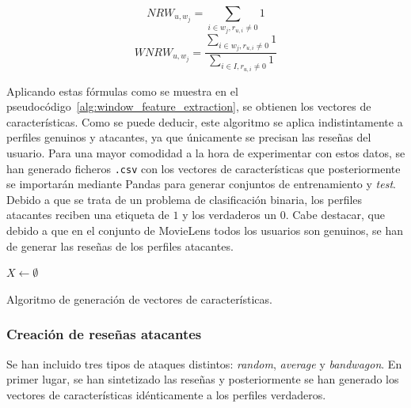 \begin{equation}\label{eqn:NRW} NRW_{u, w_j} = \sum_{i\in w_j, r_{u,i} \ne 0}^{} 1 \end{equation}
\begin{equation}\label{eqn:WNRW} WNRW_{u, w_j} = \frac{\sum_{i\in w_j, r_{u,i} \ne 0}^{} 1}{\sum_{i\in I, r_{u,i} \ne 0}^{} 1} \end{equation}

Aplicando estas fórmulas como se muestra en el pseudocódigo~\ref{alg:window_feature_extraction}, se obtienen los vectores de características. Como se puede deducir, este algoritmo se aplica indistintamente a perfiles genuinos y atacantes, ya que únicamente se precisan las reseñas del usuario. Para una mayor comodidad a la hora de experimentar con estos datos, se han generado ficheros \texttt{.csv} con los vectores de características que posteriormente se importarán mediante Pandas para generar conjuntos de entrenamiento y \textit{test}. Debido a que se trata de un problema de clasificación binaria, los perfiles atacantes reciben una etiqueta de $1$ y los verdaderos un $0$. Cabe destacar, que debido a que en el conjunto de MovieLens todos los usuarios son genuinos, se han de generar las reseñas de los perfiles atacantes. 

\begin{algorithm}
	\BlankLine
	$X \leftarrow \emptyset$\\
	\caption{Algoritmo de generación de vectores de características.}
	\label{alg:window_feature_extraction}
\end{algorithm}


\subsubsection{Creación de reseñas atacantes}

Se han incluido tres tipos de ataques distintos: \textit{random}, \textit{average} y \textit{bandwagon}. En primer lugar, se han sintetizado las reseñas y posteriormente se han generado los vectores de características idénticamente a los perfiles verdaderos.

